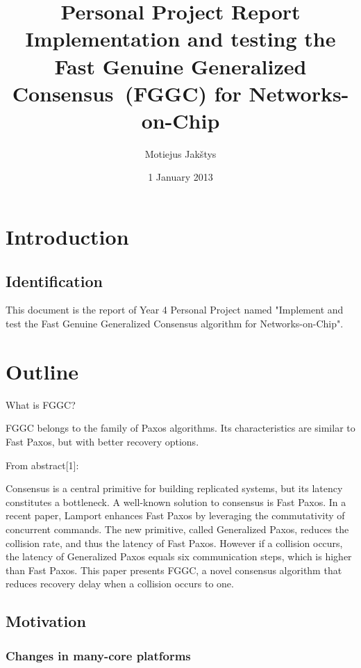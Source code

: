 \documentclass[english,11pt]{article}
\newcommand{\fggc}{Fast Genuine Generalized Consensus\ }
\begin{document}
\title{Personal Project Report\\
    Implementation and testing the \fggc (FGGC) for Networks-on-Chip}
\author{Motiejus Jakštys}
\date{1 January 2013}

\maketitle
\pagebreak
\tableofcontents
\pagebreak

\section{Introduction}
\subsection{Identification}

This document is the report of Year 4 Personal Project named "Implement and
test the Fast Genuine Generalized Consensus algorithm for Networks-on-Chip".

\section{Outline}

What is FGGC?

FGGC belongs to the family of Paxos algorithms. Its characteristics are similar
to Fast Paxos, but with better recovery options.

From abstract[1]:

Consensus is a central primitive for building replicated systems, but its
latency constitutes a bottleneck. A well-known solution to consensus is Fast
Paxos. In a recent paper, Lamport enhances Fast Paxos by leveraging the
commutativity of concurrent commands. The new primitive, called Generalized
Paxos, reduces the collision rate, and thus the latency of Fast Paxos. However
if a collision occurs, the latency of Generalized Paxos equals six
communication steps, which is higher than Fast Paxos. This paper presents FGGC,
a novel consensus algorithm that reduces recovery delay when a collision occurs
to one.

\subsection{Motivation}

\subsubsection{Changes in many-core platforms}
\end{document}
